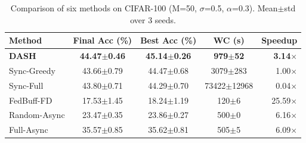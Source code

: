 \begin{table}[t]
\centering
\caption{Comparison of six methods on CIFAR-100 (M=50, $\sigma$=0.5, $\alpha$=0.3). Mean$\pm$std over 3 seeds.}
\label{tab:main}
\begin{tabular}{lcccr}
\toprule
Method & Final Acc (\%) & Best Acc (\%) & WC (s) & Speedup \\
\midrule
\textbf{DASH} & \textbf{44.47$\pm$0.46} & \textbf{45.14$\pm$0.26} & \textbf{979$\pm$52} & \textbf{3.14$\times$} \\
Sync-Greedy & 43.66$\pm$0.79 & 44.47$\pm$0.68 & 3079$\pm$283 & 1.00$\times$ \\
Sync-Full & 43.80$\pm$0.71 & 44.29$\pm$0.70 & 73422$\pm$12968 & 0.04$\times$ \\
FedBuff-FD & 17.53$\pm$1.45 & 18.24$\pm$1.19 & 120$\pm$6 & 25.59$\times$ \\
Random-Async & 23.47$\pm$0.35 & 23.86$\pm$0.27 & 500$\pm$0 & 6.16$\times$ \\
Full-Async & 35.57$\pm$0.85 & 35.62$\pm$0.81 & 505$\pm$5 & 6.09$\times$ \\
\bottomrule
\end{tabular}
\end{table}